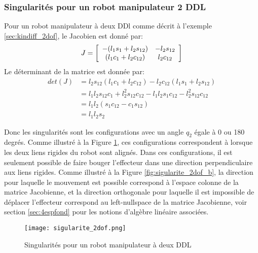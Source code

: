 \subsubsection{Singularités pour un robot manipulateur 2 DDL}

Pour un robot manipulateur à deux DDl comme décrit à l'exemple \ref{sec:kindiff_2dof}, le Jacobien est donné par:
\begin{align}
J = \left[ \begin{array}{c c} 
-(l_1 s_1 + l_2 s_{12}) & - l_2 s_{12} \\
 (l_1 c_1 + l_2 c_{12}) &   l_2 c_{12}
\end{array} \right]
\end{align} 
Le déterminant de la matrice est donnée par:
\begin{align}
det(J) &= l_2 s_{12} (l_1 c_1 + l_2 c_{12}) - l_2 c_{12} (l_1 s_1 + l_2 s_{12}) \\
       &= l_1 l_2 s_{12} c_1 + l_2^2 s_{12} c_{12} - l_1 l_2 s_1 c_{12} - l_2^2 s_{12} c_{12} \\
			 &= l_1 l_2 ( s_1 c_{12} - c_1 s_{12} ) \\
			 &= l_1 l_2 s_2
\end{align} 

Donc les singularités sont les configurations avec un angle $q_2$ égale à 0 ou 180 degrés. Comme illustré à la Figure \ref{fig:sigularite_2dof}, ces configurations correspondent à lorsque les deux liens rigides du robot sont alignés. Dans ces configurations, il est seulement possible de faire bouger l'effecteur dans une direction perpendiculaire aux liens rigides. Comme illustré à la Figure \ref{fig:sigularite_2dof_b}, la direction pour laquelle le mouvement est possible correspond à l'espace colonne de la matrice Jacobienne, et la direction orthogonale pour laquelle il est impossible de déplacer l'effecteur correspond au left-nullspace de la matrice Jacobienne, voir section \ref{sec:4espfond} pour les notions d'algèbre linéaire associées.

\begin{figure}[htbp]
	\centering
		\texttt{[image: sigularite\_2dof.png]}
	\caption{Singularités pour un robot manipulateur à deux DDL}
	\label{fig:sigularite_2dof}
\end{figure}

